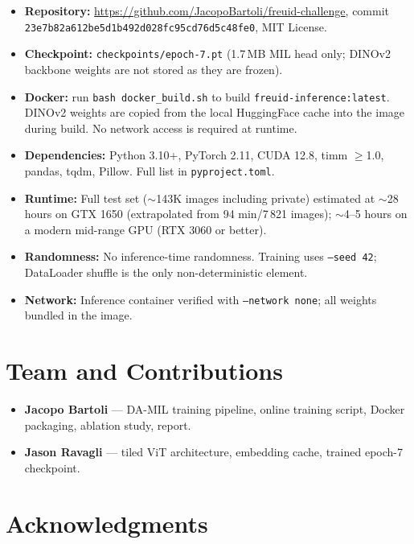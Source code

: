 \documentclass[11pt,a4paper]{article}
\begin{document}
\begin{itemize}[noitemsep]
  \item \textbf{Repository:} \url{https://github.com/JacopoBartoli/freuid-challenge}, commit \texttt{23e7b82a612be5d1b492d028fc95cd76d5c48fe0}, MIT License.
  \item \textbf{Checkpoint:} \texttt{checkpoints/epoch-7.pt} (1.7\,MB MIL head only; DINOv2 backbone weights are not stored as they are frozen).
  \item \textbf{Docker:} run \texttt{bash docker\_build.sh} to build \texttt{freuid-inference:latest}. DINOv2 weights are copied from the local HuggingFace cache into the image during build. No network access is required at runtime.
  \item \textbf{Dependencies:} Python 3.10+, PyTorch 2.11, CUDA 12.8, timm $\geq$1.0, pandas, tqdm, Pillow. Full list in \texttt{pyproject.toml}.
  \item \textbf{Runtime:} Full test set ($\sim$143K images including private) estimated at $\sim$28 hours on GTX 1650 (extrapolated from 94 min/7\,821 images); $\sim$4--5 hours on a modern mid-range GPU (RTX 3060 or better).
  \item \textbf{Randomness:} No inference-time randomness. Training uses \texttt{--seed 42}; DataLoader shuffle is the only non-deterministic element.
  \item \textbf{Network:} Inference container verified with \texttt{--network none}; all weights bundled in the image.
\end{itemize}

\section{Team and Contributions}

\begin{itemize}[noitemsep]
  \item \textbf{Jacopo Bartoli} — DA-MIL training pipeline, online training script, Docker packaging, ablation study, report.
  \item \textbf{Jason Ravagli} — tiled ViT architecture, embedding cache, trained epoch-7 checkpoint.
\end{itemize}

\section*{Acknowledgments}
\end{document}
